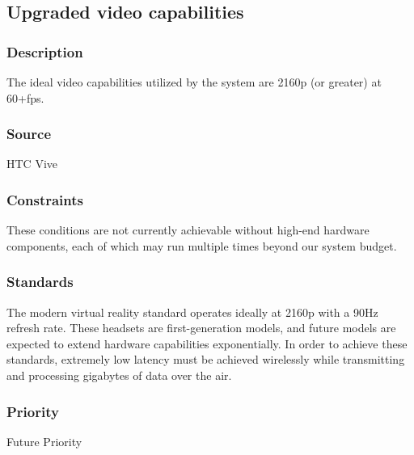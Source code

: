 
\subsection{Upgraded video capabilities}
\subsubsection{Description}
The ideal video capabilities utilized by the system are 2160p (or greater) at 60+fps.
\subsubsection{Source}
HTC Vive 
\subsubsection{Constraints}
These conditions are not currently achievable without high-end hardware components, each of which may run multiple times beyond our system budget.
\subsubsection{Standards}
The modern virtual reality standard operates ideally at 2160p with a 90Hz refresh rate. These headsets are first-generation models, and future models are expected to extend hardware capabilities exponentially. In order to achieve these standards, extremely low latency must be achieved wirelessly while transmitting and processing gigabytes of data over the air. 
\subsubsection{Priority}
Future Priority